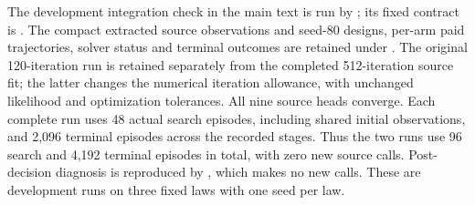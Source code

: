 \documentclass[opre,dblanonrev]{informs4}
\begin{document}
The development integration check in the main text is run by
; its fixed contract is
.
The compact extracted source observations and seed-80 designs, per-arm paid
trajectories, solver status and terminal outcomes are retained under
.  The original 120-iteration run
is retained separately from the completed 512-iteration source fit; the latter
changes the numerical iteration allowance, with unchanged likelihood and
optimization tolerances.  All nine source heads converge.  Each complete run
uses 48 actual search episodes, including shared initial observations, and
2,096 terminal episodes across the recorded stages.  Thus the two runs use
96 search and 4,192 terminal episodes in total, with zero new source calls.
Post-decision diagnosis is reproduced by
, which makes no new calls.
These are development runs on three fixed laws with one seed per law.
\end{document}
